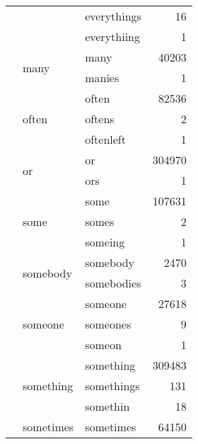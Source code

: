 \begin{longtable}[ht]{lllr}
 &  & everythings & {\cellcolor[HTML]{E6E6FA}} \color[HTML]{000000} 16 \\
 &  & everythiing & {\cellcolor[HTML]{E6E6FA}} \color[HTML]{000000} 1 \\
\cline{2-4}
 & \multirow[c]{2}{*}{many} & many & {\cellcolor[HTML]{E9BFF5}} \color[HTML]{000000} 40203 \\
 &  & manies & {\cellcolor[HTML]{E6E6FA}} \color[HTML]{000000} 1 \\
\cline{2-4}
 & \multirow[c]{3}{*}{often} & often & {\cellcolor[HTML]{EC96F0}} \color[HTML]{000000} 82536 \\
 &  & oftens & {\cellcolor[HTML]{E6E6FA}} \color[HTML]{000000} 2 \\
 &  & oftenleft & {\cellcolor[HTML]{E6E6FA}} \color[HTML]{000000} 1 \\
\cline{2-4}
 & \multirow[c]{2}{*}{or} & or & {\cellcolor[HTML]{4D0082}} \color[HTML]{F1F1F1} 304970 \\
 &  & ors & {\cellcolor[HTML]{E6E6FA}} \color[HTML]{000000} 1 \\
\cline{2-4}
 & \multirow[c]{3}{*}{some} & some & {\cellcolor[HTML]{E97CE9}} \color[HTML]{F1F1F1} 107631 \\
 &  & somes & {\cellcolor[HTML]{E6E6FA}} \color[HTML]{000000} 2 \\
 &  & someing & {\cellcolor[HTML]{E6E6FA}} \color[HTML]{000000} 1 \\
\cline{2-4}
 & \multirow[c]{2}{*}{somebody} & somebody & {\cellcolor[HTML]{E6E4FA}} \color[HTML]{000000} 2470 \\
 &  & somebodies & {\cellcolor[HTML]{E6E6FA}} \color[HTML]{000000} 3 \\
\cline{2-4}
 & \multirow[c]{3}{*}{someone} & someone & {\cellcolor[HTML]{E8CCF7}} \color[HTML]{000000} 27618 \\
 &  & someones & {\cellcolor[HTML]{E6E6FA}} \color[HTML]{000000} 9 \\
 &  & someon & {\cellcolor[HTML]{E6E6FA}} \color[HTML]{000000} 1 \\
\cline{2-4}
 & \multirow[c]{3}{*}{something} & something & {\cellcolor[HTML]{4B0082}} \color[HTML]{F1F1F1} 309483 \\
 &  & somethings & {\cellcolor[HTML]{E6E6FA}} \color[HTML]{000000} 131 \\
 &  & somethin & {\cellcolor[HTML]{E6E6FA}} \color[HTML]{000000} 18 \\
\cline{2-4}
 & sometimes & sometimes & {\cellcolor[HTML]{EBA8F3}} \color[HTML]{000000} 64150 \\
\cline{1-4} \cline{2-4}
\end{longtable}
